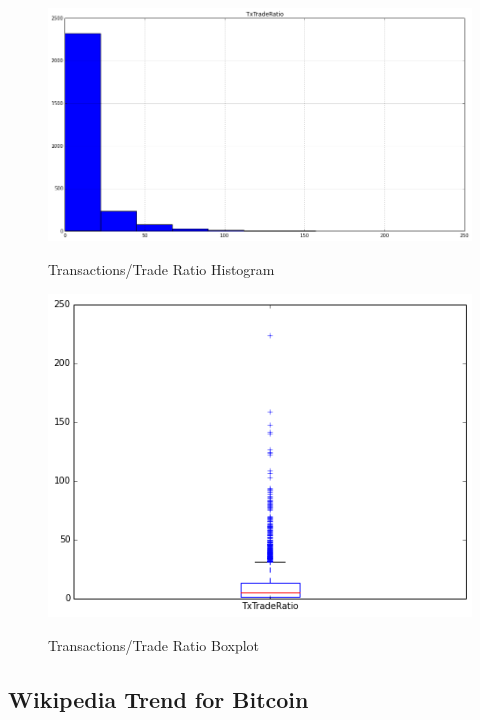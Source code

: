 \begin{figure}[bth]
  \myfloatalign
  {\includegraphics[width=1\linewidth]
    {gfx/tx-trade-ratio-histogram}}
  \caption{Transactions/Trade Ratio
    Histogram}
  \label{fig:tx-trade-ratio-histogram}
\end{figure}

\begin{figure}[bth]
  \myfloatalign
  {\includegraphics[width=1\linewidth]
    {gfx/tx-trade-ratio-boxplot}}
  \caption{Transactions/Trade Ratio
    Boxplot}
  \label{fig:tx-trade-ratio-boxplot}
\end{figure}

\clearpage

\subsection{Wikipedia Trend for Bitcoin}
\label{sec:wikipedia-trend-for-bitcoin}

